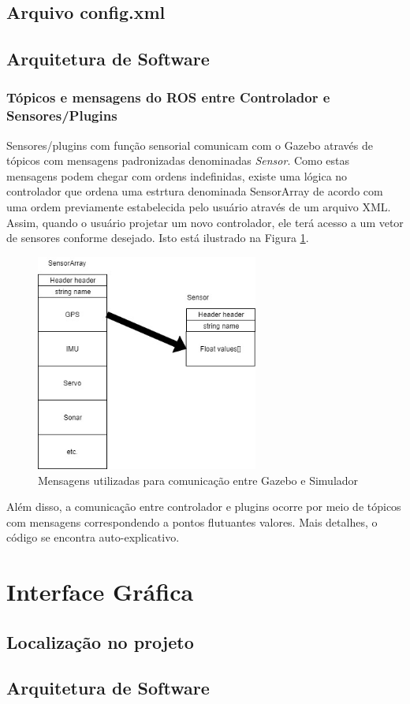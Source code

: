 \section{Arquivo config.xml}

\label{config}



\section{Arquitetura de Software}


\subsection{Tópicos e mensagens do ROS entre Controlador e Sensores/Plugins}

Sensores/plugins com função sensorial comunicam com o Gazebo através de tópicos com mensagens padronizadas denominadas \textit{Sensor}. Como estas mensagens podem chegar com ordens indefinidas, existe uma lógica no controlador que ordena uma estrtura denominada SensorArray de acordo com uma ordem previamente estabelecida pelo usuário através de um arquivo XML. Assim, quando o usuário projetar um novo controlador, ele terá acesso a um vetor de sensores conforme desejado. Isto está ilustrado na Figura \ref{Msgs1.jpg}.


\begin{figure}[H]
	\centering
	\includegraphics[width=0.65\textwidth]{figuras/Msgs1.jpg}
	\caption{Mensagens utilizadas para comunicação entre Gazebo e Simulador}
	\label{Msgs1.jpg}
\end{figure}

Além disso, a comunicação entre controlador e plugins ocorre por meio de tópicos com mensagens correspondendo a pontos flutuantes valores. Mais detalhes, o código se encontra auto-explicativo.  


\chapter{Interface Gráfica}

\section{Localização no projeto}

\section{Arquitetura de Software}


